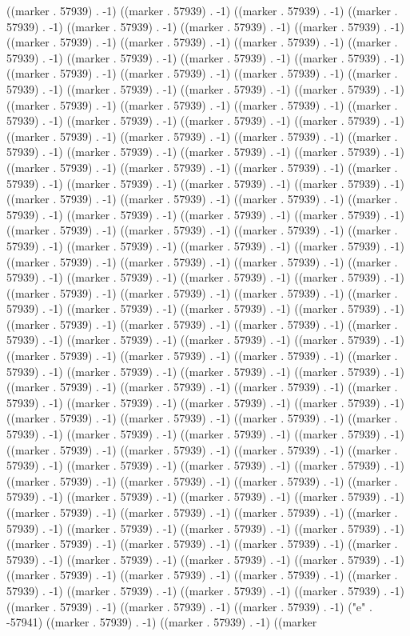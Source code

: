 ((marker . 57939) . -1) ((marker . 57939) . -1) ((marker . 57939) . -1) ((marker . 57939) . -1) ((marker . 57939) . -1) ((marker . 57939) . -1) ((marker . 57939) . -1) ((marker . 57939) . -1) ((marker . 57939) . -1) ((marker . 57939) . -1) ((marker . 57939) . -1) ((marker . 57939) . -1) ((marker . 57939) . -1) ((marker . 57939) . -1) ((marker . 57939) . -1) ((marker . 57939) . -1) ((marker . 57939) . -1) ((marker . 57939) . -1) ((marker . 57939) . -1) ((marker . 57939) . -1) ((marker . 57939) . -1) ((marker . 57939) . -1) ((marker . 57939) . -1) ((marker . 57939) . -1) ((marker . 57939) . -1) ((marker . 57939) . -1) ((marker . 57939) . -1) ((marker . 57939) . -1) ((marker . 57939) . -1) ((marker . 57939) . -1) ((marker . 57939) . -1) ((marker . 57939) . -1) ((marker . 57939) . -1) ((marker . 57939) . -1) ((marker . 57939) . -1) ((marker . 57939) . -1) ((marker . 57939) . -1) ((marker . 57939) . -1) ((marker . 57939) . -1) ((marker . 57939) . -1) ((marker . 57939) . -1) ((marker . 57939) . -1) ((marker . 57939) . -1) ((marker . 57939) . -1) ((marker . 57939) . -1) ((marker . 57939) . -1) ((marker . 57939) . -1) ((marker . 57939) . -1) ((marker . 57939) . -1) ((marker . 57939) . -1) ((marker . 57939) . -1) ((marker . 57939) . -1) ((marker . 57939) . -1) ((marker . 57939) . -1) ((marker . 57939) . -1) ((marker . 57939) . -1) ((marker . 57939) . -1) ((marker . 57939) . -1) ((marker . 57939) . -1) ((marker . 57939) . -1) ((marker . 57939) . -1) ((marker . 57939) . -1) ((marker . 57939) . -1) ((marker . 57939) . -1) ((marker . 57939) . -1) ((marker . 57939) . -1) ((marker . 57939) . -1) ((marker . 57939) . -1) ((marker . 57939) . -1) ((marker . 57939) . -1) ((marker . 57939) . -1) ((marker . 57939) . -1) ((marker . 57939) . -1) ((marker . 57939) . -1) ((marker . 57939) . -1) ((marker . 57939) . -1) ((marker . 57939) . -1) ((marker . 57939) . -1) ((marker . 57939) . -1) ((marker . 57939) . -1) ((marker . 57939) . -1) ((marker . 57939) . -1) ((marker . 57939) . -1) ((marker . 57939) . -1) ((marker . 57939) . -1) ((marker . 57939) . -1) ((marker . 57939) . -1) ((marker . 57939) . -1) ((marker . 57939) . -1) ((marker . 57939) . -1) ((marker . 57939) . -1) ((marker . 57939) . -1) ((marker . 57939) . -1) ((marker . 57939) . -1) ((marker . 57939) . -1) ((marker . 57939) . -1) ((marker . 57939) . -1) ((marker . 57939) . -1) ((marker . 57939) . -1) ((marker . 57939) . -1) ((marker . 57939) . -1) ((marker . 57939) . -1) ((marker . 57939) . -1) ((marker . 57939) . -1) ((marker . 57939) . -1) ((marker . 57939) . -1) ((marker . 57939) . -1) ((marker . 57939) . -1) ((marker . 57939) . -1) ((marker . 57939) . -1) ((marker . 57939) . -1) ((marker . 57939) . -1) ((marker . 57939) . -1) ((marker . 57939) . -1) ((marker . 57939) . -1) ((marker . 57939) . -1) ((marker . 57939) . -1) ((marker . 57939) . -1) ((marker . 57939) . -1) ((marker . 57939) . -1) ((marker . 57939) . -1) ((marker . 57939) . -1) ((marker . 57939) . -1) ((marker . 57939) . -1) ((marker . 57939) . -1) ((marker . 57939) . -1) ((marker . 57939) . -1) ((marker . 57939) . -1) ((marker . 57939) . -1) ((marker . 57939) . -1) ((marker . 57939) . -1) ((marker . 57939) . -1) ((marker . 57939) . -1) ((marker . 57939) . -1) ((marker . 57939) . -1) ((marker . 57939) . -1) ("e" . -57941) ((marker . 57939) . -1) ((marker . 57939) . -1) ((marker 
